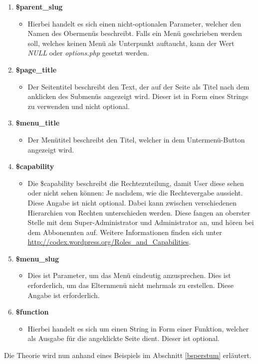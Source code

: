 \begin{enumerate}
	\item \textbf{\$parent\_slug}
	\begin{itemize}
		\item Hierbei handelt es sich einen nicht-optionalen Parameter, welcher den Namen des Obermenüs beschreibt. Falls ein Menü geschrieben werden soll, welches keinen Menü als Unterpunkt auftaucht, kann der Wert \emph{NULL} oder \emph{options.php} gesetzt werden.
	\end{itemize}
	\item \textbf{\$page\_title}
		\begin{itemize}
		\item Der Seitentitel beschreibt den Text, der auf der Seite als Titel nach dem anklicken des Submenüs angezeigt wird. Dieser ist in Form eines Strings zu verwenden und nicht optional.
	\end{itemize}
	\item \textbf{\$menu\_title}
	\begin{itemize}
		\item Der Menütitel beschreibt den Titel, welcher in dem Untermenü-Button angezeigt wird.
	\end{itemize}
	\item \textbf{\$capability}
	\begin{itemize}
		\item  Die \$capability beschreibt die Rechtezuteilung, damit User diese sehen oder nicht sehen können: Je nachdem, wie die Rechtevergabe aussieht. Diese Angabe ist nicht optional. Dabei kann zwischen verschiedenen Hierarchien von Rechten unterschieden werden. Diese fangen an oberster Stelle mit dem Super-Administrator und Administrator an, und hören bei dem Abbonennten auf. Weitere Informationen finden sich unter \url{http://codex.wordpress.org/Roles\_and\_Capabilities}.
	\end{itemize}
	\item \textbf{\$menu\_slug}
	\begin{itemize}
		\item  Dies ist Parameter, um das Menü eindeutig anzusprechen. Dies ist erforderlich, um das Elternmenü nicht mehrmals zu erstellen. Diese Angabe ist erforderlich.
	\end{itemize}
	\item \textbf{\$function}
	\begin{itemize}
		\item Hierbei handelt es sich um einen String in Form einer Funktion, welcher als Ausgabe für die angeklickte Seite dient. Dieser ist optional.
	\end{itemize}
\end{enumerate}
Die Theorie wird nun anhand eines Beispiels im Abschnitt \ref{bsperstum} erläutert.
